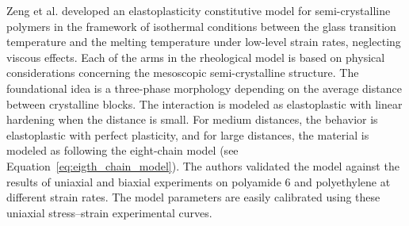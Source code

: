 



Zeng et al. \citep{zengConstitutiveModelSemicrystalline2010} developed an elastoplasticity constitutive model for semi-crystalline polymers in the framework of isothermal conditions between the glass transition temperature and the melting temperature under low-level strain rates, neglecting viscous effects.
Each of the arms in the rheological model is based on physical considerations concerning the mesoscopic semi-crystalline structure.
The foundational idea is a three-phase morphology depending on the average distance between crystalline blocks.
The interaction is modeled as elastoplastic with linear hardening when the distance is small.
For medium distances, the behavior is elastoplastic with perfect plasticity, and for large distances, the material is modeled as following the eight-chain model (see Equation~\eqref{eq:eigth_chain_model}).
The authors validated the model against the results of uniaxial and biaxial experiments on polyamide 6 and polyethylene at different strain rates.
The model parameters are easily calibrated using these uniaxial stress–strain experimental curves.

